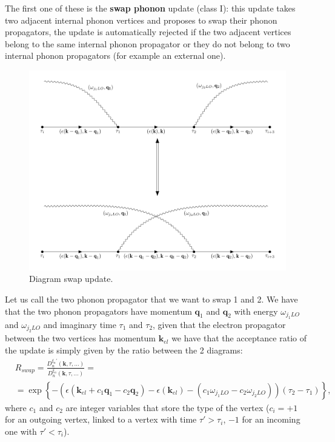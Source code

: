 The first one of these is the \textbf{swap phonon} update (class I): this update takes two adjacent internal phonon vertices and proposes to swap their 
phonon propagators, the update is automatically rejected if the two adjacent vertices belong to the same internal phonon propagator or they do not 
belong to two internal phonon propagators (for example an external one).
\begin{figure}[H]
    \centering
    \includegraphics[scale=0.6]{swap_update.pdf}
    \caption{Diagram swap update.}
    \label{fig:swap_diagram}
\end{figure}
Let us call the two phonon propagator that we want to swap 1 and 2. We have that the two phonon propagators have momentum $\mathbf{q}_1$ and $\mathbf{q}_2$ with 
energy $\omega_{j_1LO}$ and $\omega_{j_2LO}$ and imaginary time $\tau_1$ and $\tau_2$, given that the electron propagator between the two vertices has momentum $\mathbf{k}_{el}$ we have that 
the acceptance ratio of the update is simply given by the ratio between the 2 diagrams:
\begin{equation}
\begin{split}
    &R_{swap}=\frac{D_n^{\xi_n'}(\mathbf{k},\tau,...)}{D_n^{\xi_n}(\mathbf{k},\tau,...)}=\\
    &=\exp\left\{-\left(\epsilon(\mathbf{k}_{el}+c_1\mathbf{q}_1-c_2\mathbf{q}_2)-\epsilon(\mathbf{k}_{el})-(c_1\omega_{j_1LO}-c_2\omega_{j_2LO})\right)(\tau_2-\tau_1)\right\},
\end{split}
\end{equation}
where $c_1$ and $c_2$ are integer variables that store the type of the vertex ($c_i=+1$ for an outgoing vertex, linked to a vertex with time $\tau'>\tau_i$, $-1$ for an incoming one with $\tau'<\tau_i$).\\

